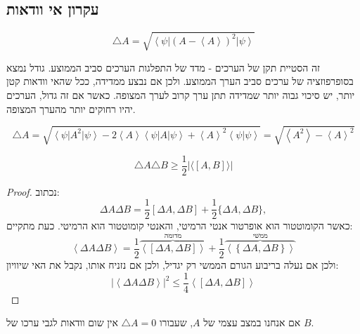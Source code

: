 \documentclass{tstextbook}
\begin{document}
\subsection{עקרון אי וודאות}

\begin{definition}
$$\triangle A = \sqrt{\left\langle\psi\right|\left(A-\left\langle A\right\rangle\right)^{2}\left|\psi\right\rangle}$$

\end{definition}
\begin{remark}
זה הסטיית תקן של הערכים - מדד של התפלגות הערכים סביב הממוצע. גודל נמצא בסופרפוזציה של ערכים סביב הערך הממוצע. ולכן אם נבצע ממדידה, ככל שהאי וודאות קטן יותר, יש סיכוי גבוה יותר שמדידה תתן ערך קרוב לערך המצופה. כאשר אם זה גדול, הערכים יהיו רחוקים יותר מהערך המצופה.

\end{remark}
\begin{proposition}
$$\triangle A=\sqrt{\left\langle\psi\right|A^{2}\left|\psi\right\rangle-2\left\langle A\right\rangle\left\langle\psi\right|A\left|\psi\right\rangle+\left\langle A\right\rangle^{2}\left\langle\psi|\psi\right\rangle}=\sqrt{\left\langle A^{2}\right\rangle-\left\langle A\right\rangle^{2}}$$

\end{proposition}
\begin{theorem}[אי הוודאות]
$$\triangle A \triangle B \geq \frac{1}{2}\left\lvert  \langle [A,B] \rangle   \right\rvert $$

\end{theorem}
\begin{proof}
נכתוב:
$$\Delta A\Delta B={\frac{1}{2}}[\Delta A,\Delta B]+{\frac{1}{2}}\{\Delta A,\Delta B\},$$
כאשר הקומוטטור הוא אופרטור אנטי הרמיטי, והאנטי קומוטטור הוא הרמיטי. כעת מתקיים:
$$\left\langle \Delta A\Delta B \right\rangle=\frac{1}{2}\overbrace{ \left\langle  \left[ \Delta A,\Delta B \right]  \right\rangle }^{ \text{מדומה} } +\frac{1}{2}\overbrace{ \left\langle \left\{ \Delta A,\Delta B \right\} \right\rangle }^{ \text{ממשי} }$$
ולכן אם נעלה בריבוע הגורם הממשי רק יגדיל, ולכן אם נזניח אותו, נקבל את האי שיוויון:
$$\left\lvert  \left\langle  \Delta A\Delta B  \right\rangle   \right\rvert ^2 \leq \frac{1}{4}\left\langle  \left[ \Delta A,\Delta B \right]  \right\rangle $$

\end{proof}
\begin{remark}
אם אנחנו במצב עצמי של \(A\), שעבורו \(\triangle A = 0\) אין שום וודאות לגבי ערכו של \(B\).

\end{remark}
\end{document}

